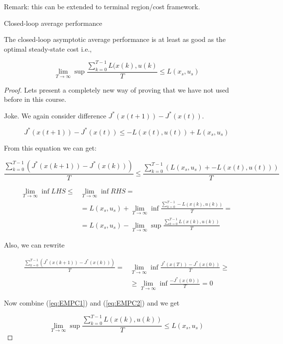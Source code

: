 Remark: this can be extended to terminal region/cost framework.

Closed-loop average performance

\begin{Theorem}
 The closed-loop asymptotic average performance is at least as good as the
 optimal steady-state cost i.e.,

 $$\lim_{T\rightarrow\infty}\sup\frac{\sum_{k=0}^{T-1}L(x(k),u(k)}{T}\le L(x_s,u_s)$$

 \begin{proof}
  Lets present a completely new way of proving that we have not used before 
  in this course.

  Joke. We again consider difference $J^*(x(t+1))-J^*(x(t))$.

  $$J^*(x(t+1))-J^*(x(t))\le -L(x(t),u(t)) + L(x_s,u_s)$$

  From this equation we can get:

  $$\frac{\sum_{k=0}^{T-1}\left(J^*(x(k+1))-J^*(x(k))\right)}{T}\le\frac{\sum_{k=0}^{T-1}\left(L(x_s,u_s)+-L(x(t),u(t))\right)}{T}$$

  \begin{equation}\label{eq:EMPC1}
   \begin{split}
    \lim_{T\rightarrow\infty}\inf LHS \le &\lim_{T\rightarrow\infty}\inf RHS = \\
    &= L(x_s,u_s)+\lim_{T\rightarrow\infty}\inf\frac{\sum_{k=0}^{T-1}-L(x(k),u(k))}{T} = \\
    &= L(x_s,u_s)-\lim_{T\rightarrow\infty}\sup\frac{\sum_{k=0}^{T-1}L(x(k),u(k))}{T} 
   \end{split}
  \end{equation}

  Also, we can rewrite

  \begin{equation}\label{eq:EMPC2}
   \begin{split}
    \frac{\sum_{k=0}^{T-1}\left(J^*(x(k+1))-J^*(x(k))\right)}{T}=&\lim_{T\rightarrow\infty}\inf\frac{J^*(x(T))-J^*(x(0))}{T} \ge \\
                       &\ge\lim_{T\rightarrow\infty}\inf\frac{-J^*(x(0))}{T} = 0
   \end{split}
  \end{equation}

  Now combine (\ref{eq:EMPC1}) and (\ref{eq:EMPC2}) and we get

  $$\lim_{T\rightarrow\infty}\sup\frac{\sum_{k=0}^{T-1}L(x(k),u(k))}{T} \le L(x_s,u_s)$$
 \end{proof}
\end{Theorem}


